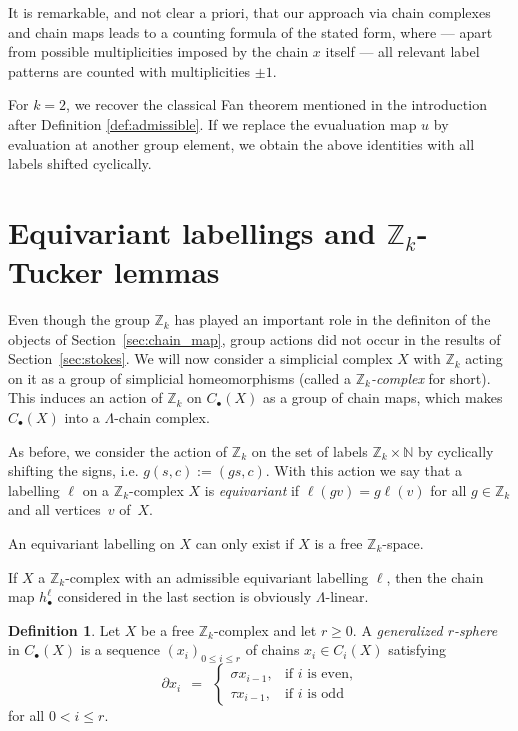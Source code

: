 \documentclass[11pt,a4paper,draft]{article}
\newcommand{\Z}{{\mathbb Z}}
\newcommand{\N}{{\mathbb N}}
\newcommand{\dd}{\partial}
\theoremstyle{definition}
\newtheorem{definition}[theorem]{Definition}
\begin{document}
It is remarkable, and not clear a priori, that our approach via chain
complexes and chain maps leads to a counting formula of the stated
form, where --- apart from possible multiplicities imposed by the chain $x$
itself --- all relevant label patterns are counted with multiplicities
$\pm 1$.

For $k=2$, we recover the classical Fan theorem mentioned in the
introduction after Definition \ref{def:admissible}.  If we replace the
evualuation map $u$ by evaluation at another group element, we 
obtain the above identities with all labels shifted cyclically.


\section{Equivariant labellings and \boldmath$\Z_k$-Tucker lemmas}
\label{sec:Tuckerlemmas}

Even though the group $\Z_k$ has played an important role in the
definiton of the objects of Section~\ref{sec:chain_map}, group actions
did not occur in the results of Section~\ref{sec:stokes}.  We will now
consider a simplicial complex $X$ with $\Z_k$ acting on it as a group
of simplicial homeomorphisms (called a {\em $\Z_k$-complex} for short).
This induces an action of $\Z_k$ on
$C_\bullet(X)$ as a group of chain maps, which makes $C_\bullet(X)$ into a
$\Lambda$-chain complex.


As before, we consider the action of $\Z_k$ on the set of labels $\Z_k \times \N$
by cyclically shifting the signs, i.e. $g (s,c) := (gs,c)$. With this
action we say that a labelling $\ell$ on a $\Z_k$-complex $X$ is
\emph{equivariant} if $\ell(gv) = g \ell(v)$ for all $g \in \Z_k$ and
all vertices~$v$ of~$X$.

An equivariant labelling on $X$ can only exist if $X$ is a free
$\Z_k$-space.

If $X$ a $\Z_k$-complex with an admissible equivariant labelling
$\ell$,  then the chain map  $h_\bullet^\ell$ considered in the last section
is obviously $\Lambda$-linear.

\begin{definition} \label{def:gensphere} Let $X$ be a free $\Z_k$-complex and let $r \geq 0$.
A {\em generalized $r$-sphere}
in $C_\bullet(X)$
is a sequence $(x_i)_{0 \leq i \leq r}$ of chains $x_i \in C_i(X)$
satisfying
\[\dd x_{i}\ \ =\ \ \begin{cases}
\sigma x_{i-1},&\text{if $i$ is even,} \\
\tau x_{i-1},&\text{if $i$ is odd}
\end{cases}
\]
for all $0 < i \leq r$. 
\end{definition}
\end{document}
